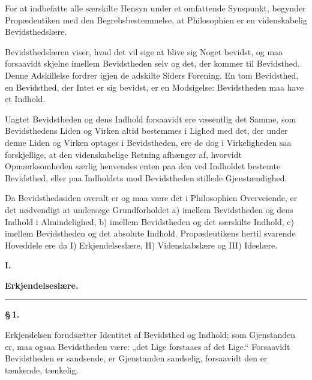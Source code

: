 \documentclass[12pt]{book}
\newcommand{\opage}[1]{\marginnote{\footnotesize\textit{[#1]}}}
\begin{document}
For at indbefatte alle særskilte Hensyn under et omfattende Synspunkt, begynder
Propædeutiken med den Begrebsbestemmelse, at Philosophien er en videnskabelig
Bevidsthedslære.

Bevidsthedslæren viser, hvad det vil sige at blive sig Noget bevidst, og maa
forsaavidt skjelne imellem Bevidstheden selv og det, der kommer til Bevidsthed.
Denne Adskillelse fordrer igjen de adskilte Siders Forening. En tom Bevidsthed, en
Bevidsthed, der Intet er sig bevidst, er en Modsigelse: Bevidstheden maa have et
Indhold.

Uagtet Bevidstheden og dens Indhold forsaavidt ere væsentlig det Samme, som
Bevidsthedens Liden og Virken altid bestemmes i Lighed med det, der under denne
Liden og Virken optages i Bevidstheden, ere de dog i Virkeligheden saa
forskjellige, at den videnskabelige Retning afhænger af, hvorvidt Opmærksomheden
særlig henvendes enten paa
\opage{5} den ved Indholdet bestemte Bevidsthed, eller paa Indholdets mod Bevidstheden
stillede Gjenstændighed.

Da Bevidsthedssiden overalt er og maa være det i Philosophien Overveiende, er det
nødvendigt at undersøge Grundforholdet a) imellem Bevidstheden og dens Indhold i
Almindelighed, b) imellem Bevidstheden og det særskilte Indhold, c) imellem
Bevidstheden og det absolute Indhold. Propædeutikens hertil svarende Hoveddele ere
da I) Erkjendelseslære, II) Videnskabslære og III) Ideelære.

\opage{5} \begin{center}
  {\large\bfseries I.}\par\vspace{4pt}
  {\Large\bfseries Erkjendelseslære.}\par\vspace{4pt}
  \rule{2.5cm}{0.4pt}
\end{center}
{}

\begin{center}{\bfseries \S\,1.}\end{center}

\noindent Erkjendelsen forudsætter Identitet af Bevidsthed og Indhold; som
Gjenstanden er, maa ogsaa Bevidstheden være: „det Lige forstaaes af det Lige.“
Forsaavidt Bevidstheden er sandsende, er Gjenstanden sandselig, forsaavidt den er
tænkende, tænkelig.
\end{document}
